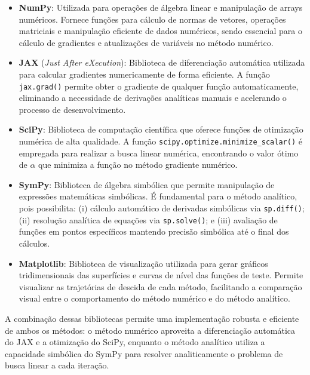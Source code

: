 \documentclass[runningheads]{llncs}
\begin{document}
\begin{itemize}

\item \textbf{NumPy}: Utilizada para operações de álgebra linear e manipulação de arrays numéricos. Fornece funções para cálculo de normas de vetores, operações matriciais e manipulação eficiente de dados numéricos, sendo essencial para o cálculo de gradientes e atualizações de variáveis no método numérico.

\item \textbf{JAX} (\textit{Just After eXecution}): Biblioteca de diferenciação automática utilizada para calcular gradientes numericamente de forma eficiente. A função \texttt{jax.grad()} permite obter o gradiente de qualquer função automaticamente, eliminando a necessidade de derivações analíticas manuais e acelerando o processo de desenvolvimento.

\item \textbf{SciPy}: Biblioteca de computação científica que oferece funções de otimização numérica de alta qualidade. A função \texttt{scipy.optimize.minimize\_scalar()} é empregada para realizar a busca linear numérica, encontrando o valor ótimo de $\alpha$ que minimiza a função no método gradiente numérico.

\item \textbf{SymPy}: Biblioteca de álgebra simbólica que permite manipulação de expressões matemáticas simbólicas. É fundamental para o método analítico, pois possibilita: (i) cálculo automático de derivadas simbólicas via \texttt{sp.diff()}; (ii) resolução analítica de equações via \texttt{sp.solve()}; e (iii) avaliação de funções em pontos específicos mantendo precisão simbólica até o final dos cálculos.

\item \textbf{Matplotlib}: Biblioteca de visualização utilizada para gerar gráficos tridimensionais das superfícies e curvas de nível das funções de teste. Permite visualizar as trajetórias de descida de cada método, facilitando a comparação visual entre o comportamento do método numérico e do método analítico.

\end{itemize}

A combinação dessas bibliotecas permite uma implementação robusta e eficiente de ambos os métodos: o método numérico aproveita a diferenciação automática do JAX e a otimização do SciPy, enquanto o método analítico utiliza a capacidade simbólica do SymPy para resolver analiticamente o problema de busca linear a cada iteração.
\end{document}
